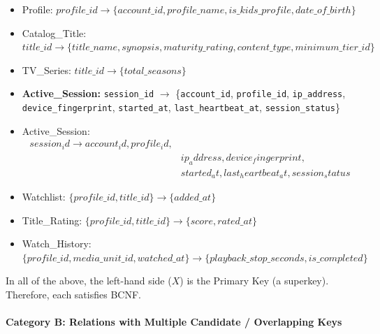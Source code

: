 \begin{itemize}
\item
  Profile: \(profile\_\allowbreak{} id \rightarrow \{ account\_\allowbreak{} id,profile\_\allowbreak{} name,is\_\allowbreak{} kids\_\allowbreak{} profile,date\_\allowbreak{} of\_\allowbreak{} birth\}\)
\item
  Catalog\_\allowbreak{}Title: \(title\_\allowbreak{} id \rightarrow \{ title\_\allowbreak{} name,synopsis,maturity\_\allowbreak{} rating,content\_\allowbreak{} type,minimum\_\allowbreak{} tier\_\allowbreak{} id\}\)
\item
  TV\_\allowbreak{}Series: \(title\_\allowbreak{} id \rightarrow \{ total\_\allowbreak{} seasons\}\)
\item
  \textbf{Active\_Session:} \texttt{session\_id} $\rightarrow$ \{\texttt{account\_id}, \texttt{profile\_id}, \texttt{ip\_address}, \texttt{device\_fingerprint}, \texttt{started\_at}, \texttt{last\_heartbeat\_at}, \texttt{session\_status}\}
\item
  Active\_\allowbreak{}Session:\\
  \[\begin{aligned} session_{i}d \rightarrow account_{i}d,profile_{i}d,\\ &ip_{a}ddress,device_{f}ingerprint,\\ &started_{a}t,last_{h}eartbeat_{a}t,session_{s}tatus \end{aligned}\]
\item
  Watchlist: \(\{ profile\_\allowbreak{} id,title\_\allowbreak{} id\} \rightarrow \{ added\_\allowbreak{} at\}\)
\item
  Title\_\allowbreak{}Rating: \(\{ profile\_\allowbreak{} id,title\_\allowbreak{} id\} \rightarrow \{ score,rated\_\allowbreak{} at\}\)
\item
  Watch\_\allowbreak{}History: \(\{ profile\_\allowbreak{} id,media\_\allowbreak{} unit\_\allowbreak{} id,watched\_\allowbreak{} at\} \rightarrow \{ playback\_\allowbreak{} stop\_\allowbreak{} seconds,is\_\allowbreak{} completed\}\)
\end{itemize}

In all of the above, the left-hand side (\(X\)) is the Primary Key (a superkey). Therefore, each satisfies BCNF.

\paragraph{Category B: Relations with Multiple Candidate / Overlapping Keys}\label{category-b-relations-with-multiple-candidate-overlapping-keys}

